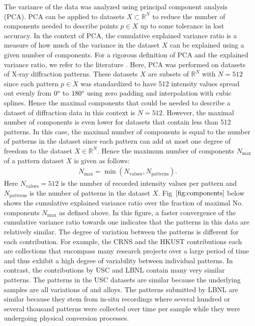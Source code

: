 The variance of the data was analyzed using principal component analysis (PCA). PCA can be applied to datasets $X \subset \mathbb{R}^N$ to reduce the number of components needed to describe points $p \in X$ up to some tolerance in lost accuracy. In the context of PCA, the cumulative explained variance ratio is a measure of how much of the variance in the dataset $X$ can be explained using a given number of components. For a rigorous definition of PCA and the explained variance ratio, we refer to the literature \cite{Jolliffe2016}. Here, PCA was performed on datasets of X-ray diffraction patterns. These datasets $X$ are subsets of $\mathbb{R}^{N}$ with $N=512$ since each pattern $p \in X$ was standardized to have 512 intensity values spread out evenly from $0\degree$ to $180\degree$ using zero padding and interpolation with cubic splines. Hence the maximal components that could be needed to describe a dataset of diffraction data in this context is $N=512$. However, the maximal number of components is even lower for datasets that contain less than 512 patterns. In this case, the maximal number of components is equal to the number of patterns in the dataset since each pattern can add at most one degree of freedom to the dataset $X \in \mathbb{R}^N$. Hence the maximum number of components $N_{\text{max}}$ of a pattern dataset $X$ is given as follows:
\begin{align}
    N_{\text{max}} = \min(N_{\text{values}}, N_{\text{patterns}}).
      \label{eq:nmax}
\end{align}
Here $N_{\text{values}} =512$ is the number of recorded intensity values per pattern and $N_{\text{patterns}}$ is the number of patterns in the dataset $X$. Fig~$\eqref{fig:components}$ below shows the cumulative explained variance ratio over the fraction of maximal No. components $N_{\text{max}}$ as defined above. In this figure, a faster convergence of the cumulative variance ratio towards one indicates that the patterns in this data are relatively similar. The degree of variation between the patterns is different for each contribution. For example, the CRNS and the HKUST contributions each are collections that encompass many research projects over a large period of time and thus exhibit a high degree of variability between individual patterns. In contrast, the contributions by USC and LBNL contain many very similar patterns. The patterns in the USC datasets are similar because the underlying samples are all variations of  and  alloys. The patterns submitted by LBNL are similar because they stem from in-situ recordings where several hundred or several thousand patterns were collected over time per sample while they were undergoing physical conversion processes.

